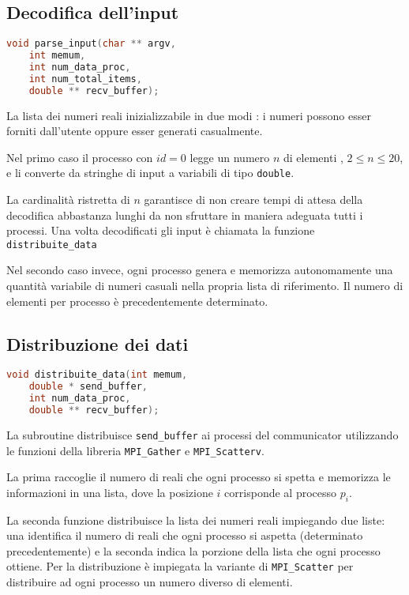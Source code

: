 \documentclass[a4paper,11pt]{book}
\begin{document}
\subsection{Decodifica dell'input}
\begin{lstlisting}[language=C]
void parse_input(char ** argv, 
    int memum, 
    int num_data_proc, 
    int num_total_items, 
    double ** recv_buffer);
\end{lstlisting}
La lista dei numeri reali inizializzabile in due modi : i numeri possono esser forniti dall'utente oppure esser generati casualmente.\par 
Nel primo caso il processo con $id=0$ legge un numero $n$ di elementi , $2 \leq n \leq 20$, e li converte da stringhe di input a variabili di tipo \verb|double|. \par 
La cardinalità ristretta di $n$ garantisce di non creare tempi di attesa della decodifica abbastanza lunghi da non sfruttare in maniera adeguata tutti i processi. Una volta decodificati gli input è chiamata la funzione \verb|distribuite_data| \par
Nel secondo caso invece, ogni processo genera e memorizza autonomamente una quantità variabile di numeri casuali nella propria lista di riferimento. Il numero di elementi per processo è precedentemente determinato. 

\subsection{Distribuzione dei dati}
\begin{lstlisting}[language=C]
void distribuite_data(int memum, 
    double * send_buffer, 
    int num_data_proc, 
    double ** recv_buffer);
\end{lstlisting}
La subroutine distribuisce \verb|send_buffer| ai processi del communicator utilizzando le funzioni della libreria \verb|MPI_Gather| e \verb|MPI_Scatterv|.\par 
La prima raccoglie il numero di reali che ogni processo si spetta e memorizza le informazioni in una lista, dove la posizione $i$ corrisponde al processo $p_i$. \par 
La seconda funzione distribuisce la lista dei numeri reali impiegando due liste: una identifica il numero di reali che ogni processo si aspetta (determinato precedentemente) e la seconda indica la porzione della lista che ogni processo ottiene. Per la distribuzione è impiegata la variante di \verb|MPI_Scatter| per distribuire ad ogni processo un numero diverso di elementi.
\end{document}
